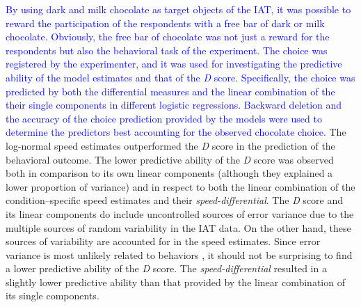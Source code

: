\documentclass[12pt]{book}
\begin{document}
\textcolor{blue}{By using dark and milk chocolate as target objects of the IAT, it was possible to reward the participation of the respondents with a free bar of dark or milk chocolate. Obviously, the free bar of chocolate was not just a reward for the respondents but also the behavioral task of the experiment. The choice was registered by the experimenter, and it was used for investigating the predictive ability of the model estimates and that of the \emph{D} score. Specifically, the choice was predicted by both the differential measures and the linear combination of the their single components in different logistic regressions. Backward deletion and  the accuracy of the choice prediction provided by the models were used to determine the predictors best accounting for the observed chocolate choice. }
 The log-normal speed estimates outperformed the \emph{D} score in the prediction of the behavioral outcome. 
The lower predictive ability of the \emph{D} score was observed both in comparison to its own linear components (although they explained a lower proportion of variance) and in respect to both the linear combination of the condition--specific speed estimates and their \emph{speed-differential}. 
The \emph{D} score and its linear components do include uncontrolled sources of error variance due to the multiple sources of random variability in the IAT data. On the other hand, these sources of variability are accounted for in the speed estimates. Since error variance is most unlikely related to behaviors \cite{meissner2019}, it should not be surprising to find a lower predictive ability of the \emph{D} score. 
The \emph{speed-differential} resulted in a slightly lower predictive ability than that provided by the linear combination of its single components.
\end{document}
